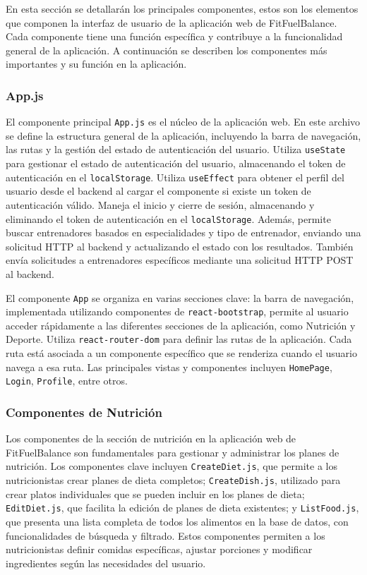 En esta sección se detallarán los principales componentes, estos son los elementos que componen la interfaz de usuario de la aplicación web de FitFuelBalance. Cada componente tiene una función específica y contribuye a la funcionalidad general de la aplicación. A continuación se describen los componentes más importantes y su función en la aplicación.
\subsubsection{App.js}
El componente principal \texttt{App.js}  es el núcleo de la aplicación web. En este archivo se define la estructura general de la aplicación, incluyendo la barra de navegación, las rutas y la gestión del estado de autenticación del usuario. Utiliza \texttt{useState} para gestionar el estado de autenticación del usuario, almacenando el token de autenticación en el \texttt{localStorage}. Utiliza \texttt{useEffect} para obtener el perfil del usuario desde el backend al cargar el componente si existe un token de autenticación válido. Maneja el inicio y cierre de sesión, almacenando y eliminando el token de autenticación en el \texttt{localStorage}. Además, permite buscar entrenadores basados en especialidades y tipo de entrenador, enviando una solicitud HTTP al backend y actualizando el estado con los resultados. También envía solicitudes a entrenadores específicos mediante una solicitud HTTP POST al backend.

El componente \texttt{App} se organiza en varias secciones clave: la barra de navegación, implementada utilizando componentes de \texttt{react-bootstrap}, permite al usuario acceder rápidamente a las diferentes secciones de la aplicación, como Nutrición y Deporte. Utiliza \texttt{react-router-dom} para definir las rutas de la aplicación. Cada ruta está asociada a un componente específico que se renderiza cuando el usuario navega a esa ruta. Las principales vistas y componentes incluyen \texttt{HomePage}, \texttt{Login}, \texttt{Profile}, entre otros.

\subsubsection{Componentes de Nutrición}
Los componentes de la sección de nutrición  en la aplicación web de FitFuelBalance son fundamentales para gestionar y administrar los planes de nutrición. Los componentes clave incluyen \texttt{CreateDiet.js}, que permite a los nutricionistas crear planes de dieta completos; \texttt{CreateDish.js}, utilizado para crear platos individuales que se pueden incluir en los planes de dieta; \texttt{EditDiet.js}, que facilita la edición de planes de dieta existentes; y \texttt{ListFood.js}, que presenta una lista completa de todos los alimentos en la base de datos, con funcionalidades de búsqueda y filtrado. Estos componentes permiten a los nutricionistas definir comidas específicas, ajustar porciones y modificar ingredientes según las necesidades del usuario.

